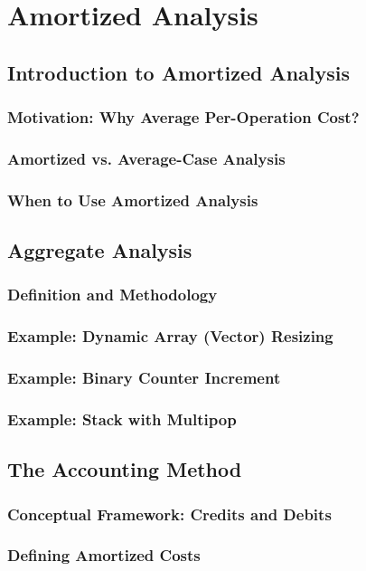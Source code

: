 
\chapter{Amortized Analysis}
\section{Introduction to Amortized Analysis}
\subsection{Motivation: Why Average Per-Operation Cost?}
\subsection{Amortized vs. Average-Case Analysis}
\subsection{When to Use Amortized Analysis}

\section{Aggregate Analysis}
\subsection{Definition and Methodology}
\subsection{Example: Dynamic Array (Vector) Resizing}
\subsection{Example: Binary Counter Increment}
\subsection{Example: Stack with Multipop}

\section{The Accounting Method}
\subsection{Conceptual Framework: Credits and Debits}
\subsection{Defining Amortized Costs}
